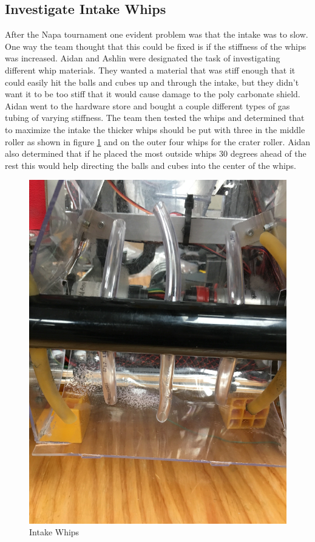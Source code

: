 \documentclass{article}
\begin{document}
\subsection{Investigate Intake Whips}
After the Napa tournament one evident problem was that the intake was to slow. One way the team thought that this could be fixed is if the stiffness of the whips was increased. Aidan and Ashlin were designated the task of investigating different whip materials. They wanted a material that was stiff enough that it could easily hit the balls and cubes up and through the intake, but they didn't want it to be too stiff that it would cause damage to the poly carbonate shield. Aidan went to the hardware store and bought a couple different types of gas tubing of varying stiffness. The team then tested the whips and determined that to maximize the intake the thicker whips should be put with three in the middle roller as shown in figure \ref{fig:whips} and on the outer four whips for the crater roller. Aidan also determined that if he placed the most outside whips 30 degrees ahead of the rest this would help directing the balls and cubes into the center of the whips.

\begin{figure}
    \centering
    \includegraphics[width=.6 \textwidth]{24_02-11/images/intakewhips.JPG}
    \caption{Intake Whips}
    \label{fig:whips}
\end{figure}
\end{document}
